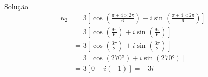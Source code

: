 \begin{resolution}{Solução}
\begin{align*}
  u_2
  & = 3 \left[
  \cos\left( \frac{\pi + 4\times2\pi}{6} \right)
  + i \sin\left( \frac{\pi + 4\times2\pi}{6} \right)
  \right] \\
  & = 3 \left[
  \cos\left( \frac{9\pi}{6} \right)
  + i \sin\left( \frac{9\pi}{6} \right)
  \right] \\
  & = 3 \left[
  \cos\left( \frac{3\pi}{2} \right)
  + i \sin\left( \frac{3\pi}{2} \right)
  \right] \\
  & = 3 \left[
  \cos\left( \ang{270} \right)
  + i \sin\left( \ang{270} \right)
  \right] \\
  & = 3 \left[
  0
  + i (-1)
  \right]
  = -3i
\end{align*}
\end{resolution}

